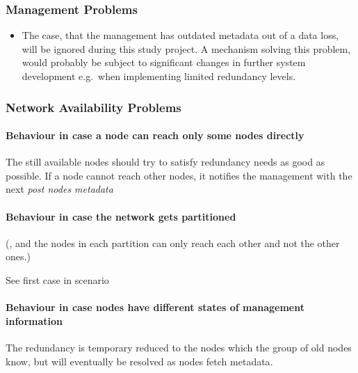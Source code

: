\subsubsection{Management Problems}\label{sec:scenario-management-problems}
\begin{itemize}
    \item The case, that the \gls{management} has outdated \gls{metadata} out of a data loss, will be ignored during this study project. A mechanism solving this problem, would probably be subject to significant changes in further system development e.g.\ when implementing limited redundancy levels. %
\end{itemize}

\subsubsection{Network Availability Problems}\label{sec:scenario-network-errors}
\paragraph{Behaviour in case a node can reach only some nodes directly}
The still available \glspl{node} should try to satisfy redundancy needs as good as possible.
If a \gls{node} cannot reach other \glspl{node}, it notifies the \gls{management} with the next \emph{post nodes metadata}

\paragraph{Behaviour in case the network gets partitioned}
(, and the \glspl{node} in each partition can only reach each other and not the other ones.)

See first case in scenario~

\paragraph{Behaviour in case nodes have different states of management information}
The redundancy is temporary reduced to the \glspl{node} which the group of old \glspl{node} know, but will eventually be resolved as \glspl{node} fetch \gls{metadata}.